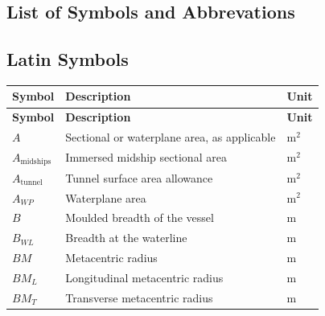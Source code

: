 \begin{appendices}
\chapter{List of Symbols and Abbrevations}





\section*{Latin Symbols}

\renewcommand{\arraystretch}{1.15}
\setlength{\tabcolsep}{5pt}

\begin{longtable}{@{}p{}
                      p{}
                      p{}@{}}
\toprule
\textbf{Symbol} & \textbf{Description} & \textbf{Unit} \\
\midrule
\endfirsthead

\toprule
\textbf{Symbol} & \textbf{Description} & \textbf{Unit} \\
\midrule
\endhead

\bottomrule
\endfoot

$A$ & Sectional or waterplane area, as applicable & m$^2$ \\
$A_{\mathrm{midships}}$ & Immersed midship sectional area & m$^2$ \\
$A_{\mathrm{tunnel}}$ & Tunnel surface area allowance & m$^2$ \\
$A_{WP}$ & Waterplane area & m$^2$ \\

$B$ & Moulded breadth of the vessel & m \\
$B_{WL}$ & Breadth at the waterline & m \\
$BM$ & Metacentric radius & m \\
$BM_L$ & Longitudinal metacentric radius & m \\
$BM_T$ & Transverse metacentric radius & m \\


\end{longtable}
\end{appendices}
